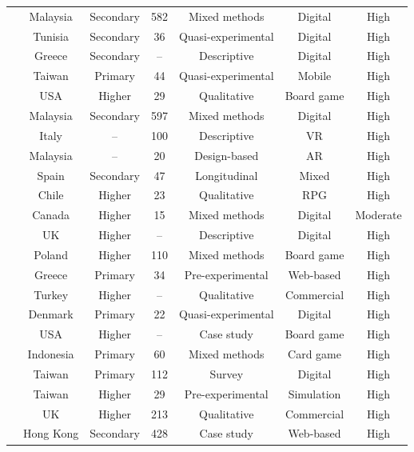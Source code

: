 \documentclass[a4paper,fleqn]{cas-sc}
\begin{document}
\begin{longtable}{|p{4.6cm}|c|c|c|c|c|c|}
\citet{23Zin2009322} & Malaysia & Secondary & 582 & Mixed methods & Digital & High \\
\citet{24Ghannem2019} & Tunisia & Secondary & 36 & Quasi-experimental & Digital & High \\
\citet{25Repantis2011502} & Greece & Secondary & -- & Descriptive & Digital & High \\
\citet{28Chao201734} & Taiwan & Primary & 44 & Quasi-experimental & Mobile & High \\
\citet{29Stiso20201165} & USA & Higher & 29 & Qualitative & Board game & High \\
\citet{30Zin2008} & Malaysia & Secondary & 597 & Mixed methods & Digital & High \\
\citet{31DeAmicis2009451} & Italy & -- & 100 & Descriptive & VR & High \\
\citet{32Cheng20241718} & Malaysia & -- & 20 & Design-based & AR & High \\
\citet{34Serrano2023} & Spain & Secondary & 47 & Longitudinal & Mixed & High \\
\citet{35Fernandez2023} &  Chile & Higher & 23 & Qualitative & RPG & High \\
\citet{36Scholz2021} & Canada & Higher & 15 & Mixed methods & Digital & Moderate \\
\citet{37Lewis202054} & UK & Higher & -- & Descriptive & Digital & High \\
\citet{38Mercik2024} & Poland & Higher & 110 & Mixed methods & Board game & High \\
\citet{39Tegos2014838} & Greece & Primary & 34 & Pre-experimental & Web-based & High \\
\citet{40Kuran2018} & Turkey & Higher & -- & Qualitative & Commercial & High \\
\citet{41Petersen2023301} & Denmark & Primary & 22 & Quasi-experimental & Digital & High \\
\citet{42Huffer201581} & USA & Higher & -- & Case study & Board game & High \\
\citet{43ali2018indonesian} & Indonesia & Primary & 60 & Mixed methods & Card game & High \\
\citet{44Shiue2016} & Taiwan & Primary & 112 & Survey & Digital & High \\
\citet{45Yu2016727} & Taiwan & Higher & 29 & Pre-experimental & Simulation & High \\
\citet{46Stirling2022} & UK & Higher & 213 & Qualitative & Commercial & High \\
\citet{47Clara2010156} & Hong Kong & Secondary & 428 & Case study & Web-based & High \\

\end{longtable}
\end{document}
